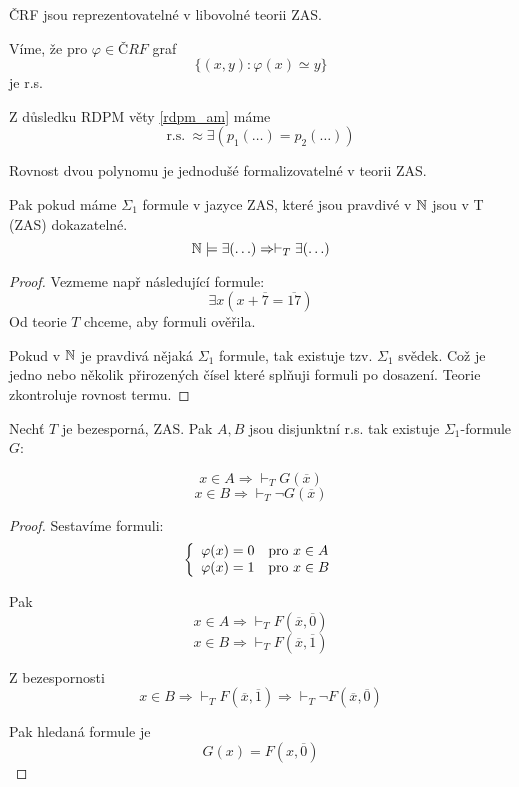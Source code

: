 \begin{observation}
	ČRF jsou reprezentovatelné v libovolné teorii ZAS.

	Víme, že pro $\varphi \in ČRF$ graf
	\[ \{ (x, y): \varphi(x) \simeq y \} \]
	je r.s.

	Z důsledku RDPM věty \cref{rdpm_am} máme
	\[ \text{r.s.}\ \approx \exists(p_1(\ldots) = p_2(\ldots)) \]

	Rovnost dvou polynomu je jednodušé formalizovatelné v teorii ZAS.

\end{observation}

\begin{theorem}[Vztah $\N a\ T$]
	Pak pokud máme $\Sigma_1$ formule v jazyce ZAS, které jsou pravdivé v $\operatorname{\mathbb{N}}$ jsou v T (ZAS) dokazatelné.
	\[ \operatorname{\mathbb{N}} \models \exists (\ldots) \Rightarrow \vdash_T \exists (\ldots) \]
\end{theorem}
\begin{proof}
	Vezmeme např následující formule:
	\[ \exists x (x + \overline{7} = \overline{17})\]
	Od teorie $T$ chceme, aby formuli ověřila.

	Pokud v $\operatorname{\mathbb{N}}$ je pravdivá nějaká $\Sigma_1$ formule, tak existuje tzv. $\Sigma_1$ svědek.
	Což je jedno nebo několik přirozených čísel které splňuji formuli po dosazení.
	Teorie zkontroluje rovnost termu.
\end{proof}

\begin{lemma}
	Nechť $T$ je bezesporná, ZAS.
	Pak $A, B$ jsou disjunktní r.s. tak existuje $\Sigma_1$-formule $G$:

	\[ x \in A \Rightarrow \vdash_T G(\overline{x}) \]
	\[ x \in B \Rightarrow \vdash_T \neg G(\overline{x}) \]
\end{lemma}
\begin{proof}
	Sestavíme formuli:
	\[ \left\{ \begin{array}{ll} \varphi(x) = 0 & \mbox{pro } x \in A \\ \varphi(x) = 1 & \mbox{pro } x \in B \end{array} \right. \]

	Pak
	\[ x \in A \Rightarrow \vdash_T F(\overline{x}, \overline{0}) \]
	\[ x \in B \Rightarrow \vdash_T F(\overline{x}, \overline{1}) \]

	Z bezespornosti
	\[ x \in B \Rightarrow \vdash_T F(\overline{x}, \overline{1}) \Rightarrow \vdash_T \neg F(\overline{x}, \overline{0}) \]

	Pak hledaná formule je
	\[ G(x) = F(x, \overline{0}) \]
\end{proof}

